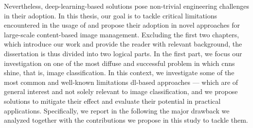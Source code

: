 Nevertheless, deep-learning-based solutions pose non-trivial engineering challenges in their adoption.
In this thesis, our goal is to tackle critical limitations encountered in the usage of  and propose their adoption in novel approaches for large-scale content-based image management.
Excluding the first two chapters, which introduce our work and provide the reader with relevant background, the dissertation is thus divided into two logical parts.
In the first part, we focus our investigation on one of the most diffuse and successful problem in which \glspl{cnn} shine, that is, image classification.
In this context, we investigate some of the most common and well-known limitations \gls{dl}-based approaches --- which are of general interest and not solely relevant to image classification, and we propose solutions to mitigate their effect and evaluate their potential in practical applications.
Specifically, we report in the following the major drawback we analyzed together with the contributions we propose in this study to tackle them.

